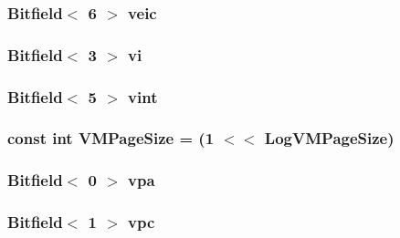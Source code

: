 \label{namespaceMipsISA_ad5c29b27e529af3e788395fdaf063787}
\hypertarget{namespaceMipsISA_af60b6cf455b82f6c8973f6639e3e7568}{
\subsubsection[{veic}]{\setlength{\rightskip}{0pt plus 5cm}Bitfield$<$ 6 $>$ {\bf veic}}}
\label{namespaceMipsISA_af60b6cf455b82f6c8973f6639e3e7568}
\hypertarget{namespaceMipsISA_a8e14145a8248890f18012721fd78ea2d}{
\subsubsection[{vi}]{\setlength{\rightskip}{0pt plus 5cm}Bitfield$<$ 3 $>$ {\bf vi}}}
\label{namespaceMipsISA_a8e14145a8248890f18012721fd78ea2d}
\hypertarget{namespaceMipsISA_abc57668ac21986bfc581884533f58c32}{
\subsubsection[{vint}]{\setlength{\rightskip}{0pt plus 5cm}Bitfield$<$ 5 $>$ {\bf vint}}}
\label{namespaceMipsISA_abc57668ac21986bfc581884533f58c32}
\hypertarget{namespaceMipsISA_a891eaf95159d764e6efae501c2860a3a}{
\subsubsection[{VMPageSize}]{\setlength{\rightskip}{0pt plus 5cm}const int {\bf VMPageSize} = (1 $<$$<$ {\bf LogVMPageSize})}}
\label{namespaceMipsISA_a891eaf95159d764e6efae501c2860a3a}
\hypertarget{namespaceMipsISA_afeada43f172af66e3070955f6fbdae0f}{
\subsubsection[{vpa}]{\setlength{\rightskip}{0pt plus 5cm}Bitfield$<$ 0 $>$ {\bf vpa}}}
\label{namespaceMipsISA_afeada43f172af66e3070955f6fbdae0f}
\hypertarget{namespaceMipsISA_ae4fb9014ffa95845f9d0c9c9a1c5954d}{
\subsubsection[{vpc}]{\setlength{\rightskip}{0pt plus 5cm}Bitfield$<$ 1 $>$ {\bf vpc}}}
